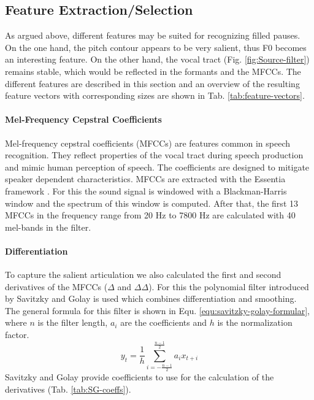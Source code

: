 \documentclass[letterpaper]{article}
\begin{document}
\subsection{Feature Extraction/Selection}\label{sec:feature-extraction}
As argued above, different features may be suited for recognizing filled pauses. On the one hand, the pitch contour appears to be very salient, thus F0 becomes an interesting feature. On the other hand, the vocal tract (Fig. \ref{fig:Source-filter}) remains stable, which would be reflected in the formants and the MFCCs. The different features are described in this section and an overview of the resulting feature vectors with corresponding sizes are shown in Tab. \ref{tab:feature-vectors}.
\paragraph{Mel-Frequency Cepstral Coefficients}
Mel-frequency cepstral coefficients (MFCCs) are features common in speech recognition. They reflect properties of the vocal tract during speech production and mimic human perception of speech. The coefficients are designed to mitigate speaker dependent characteristics. MFCCs are extracted with the Essentia framework \cite{Bogdanov2013}. For this the sound signal is windowed with a Blackman-Harris window and the spectrum of this window is computed. After that, the first 13 MFCCs in the frequency range from 20 Hz to 7800 Hz are calculated with 40 mel-bands in the filter.
\paragraph{Differentiation}
To capture the salient articulation we also calculated the first and second derivatives of the MFCCs ($\Delta$ and $\Delta\Delta$). For this the polynomial filter introduced by Savitzky and Golay \cite{Savitzky1964} is used which combines differentiation and smoothing. The general formula for this filter is shown in Equ. \ref{equ:savitzky-golay-formular}, where $n$ is the filter length, $a_i$ are the coefficients and $h$ is the normalization factor.
\begin{equation}
y_t=\frac{1}{h}\sum_{i=-\frac{n-1}{2}}^{\frac{n-1}{2}}a_ix_{t+i}
\label{equ:savitzky-golay-formular}
\end{equation}
Savitzky and Golay provide coefficients to use for the calculation of the derivatives (Tab. \ref{tab:SG-coeffs}).

\begin{table}[h]
	\caption{Savitzky-Golay filter coefficients}
	\label{tab:SG-coeffs}
\end{table}
\end{document}
